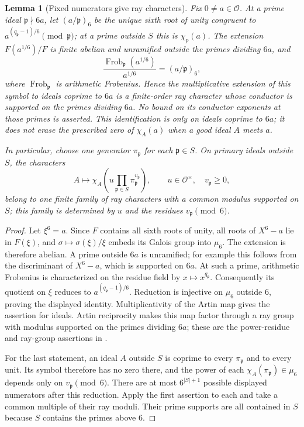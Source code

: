 \documentclass[11pt,a4paper]{article}
\numberwithin{equation}{section}
\numberwithin{figure}{section}
\newtheorem{lemma}[theorem]{Lemma}
\theoremstyle{definition}
\theoremstyle{remark}
\begin{document}
\begin{lemma}[Fixed numerators give ray characters]
\label{lem:fixed-numerator-ray}
Fix $0\ne a\in\mathcal O$.  At a prime ideal $\mathfrak p\nmid6a$, let
$(a/\mathfrak p)_6$ be the unique sixth root of unity congruent to
$a^{(q_{\mathfrak p}-1)/6}\pmod{\mathfrak p}$; at a prime outside $S$ this is
$\chi_p(a)$.  The extension $F(a^{1/6})/F$ is finite abelian and unramified
outside the primes dividing $6a$, and
\[
 \frac{\operatorname{Frob}_{\mathfrak p}(a^{1/6})}{a^{1/6}}
       =(a/\mathfrak p)_6,
\]
where $\operatorname{Frob}_{\mathfrak p}$ is arithmetic Frobenius.  Hence the
multiplicative extension of this symbol to ideals coprime to $6a$ is a
finite-order ray character whose conductor is supported on the primes
dividing $6a$.  No bound on its conductor exponents at those primes is
asserted.  This identification is only on ideals coprime to $6a$; it does
not erase the prescribed zero of $\chi_A(a)$ when a good ideal $A$ meets $a$.

In particular, choose one generator $\pi_{\mathfrak p}$ for each
$\mathfrak p\in S$.  On primary ideals outside $S$, the characters
\[
 A\longmapsto\chi_A\left(u\prod_{\mathfrak p\in S}
                       \pi_{\mathfrak p}^{v_{\mathfrak p}}\right),
 \qquad u\in\mathcal O^\times,\quad v_{\mathfrak p}\ge0,
\]
belong to one finite family of ray characters with a common modulus
supported on $S$; this family is determined by $u$ and the residues
$v_{\mathfrak p}\pmod6$.
\end{lemma}

\begin{proof}
Let $\xi^6=a$.  Since $F$ contains all sixth roots of unity, all roots of
$X^6-a$ lie in $F(\xi)$, and
$\sigma\mapsto\sigma(\xi)/\xi$ embeds its Galois group into $\mu_6$.
The extension is therefore abelian.  A prime outside $6a$ is unramified;
for example this follows from the discriminant of $X^6-a$, which is supported
on $6a$.  At such a prime, arithmetic Frobenius is characterized on the
residue field by $x\mapsto x^{q_{\mathfrak p}}$.  Consequently its quotient
on $\xi$ reduces to $a^{(q_{\mathfrak p}-1)/6}$.  Reduction is injective on
$\mu_6$ outside $6$, proving the displayed identity.  Multiplicativity of
the Artin map gives the assertion for ideals.  Artin reciprocity makes this
map factor through a ray group with modulus supported on the primes dividing
$6a$; these are the power-residue and ray-group assertions in
\cite[Chapter VIII, (5.3) and (5.5)]{MilneCFT}.

For the last statement, an ideal $A$ outside $S$ is coprime to every
$\pi_{\mathfrak p}$ and to every unit.  Its symbol therefore has no zero
there, and the power of each $\chi_A(\pi_{\mathfrak p})\in\mu_6$ depends
only on $v_{\mathfrak p}\pmod6$.  There are at most
$6^{|S|+1}$ possible displayed numerators after this reduction.  Apply the
first assertion to each and take a common multiple of their ray moduli.
Their prime supports are all contained in $S$ because $S$ contains the
primes above $6$.
\end{proof}
\end{document}
